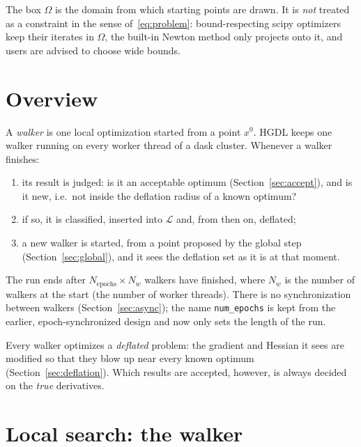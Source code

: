\documentclass[11pt]{article}
\newcommand{\code}[1]{\texttt{#1}}
\begin{document}
The box $\Omega$ is the domain from which starting points are drawn. It is \emph{not} treated as
a constraint in the sense of~\eqref{eq:problem}: bound-respecting scipy optimizers keep their
iterates in $\Omega$, the built-in Newton method only projects onto it, and users are advised
to choose wide bounds.

\section{Overview}\label{sec:overview}

A \emph{walker} is one local optimization started from a point $x^0$. HGDL keeps one walker
running on every worker thread of a dask cluster. Whenever a walker finishes:
\begin{enumerate}
  \item its result is judged: is it an acceptable optimum (Section~\ref{sec:accept}), and is it
  new, i.e.\ not inside the deflation radius of a known optimum?
  \item if so, it is classified, inserted into $\mathcal{L}$ and, from then on, deflated;
  \item a new walker is started, from a point proposed by the global step
  (Section~\ref{sec:global}), and it sees the deflation set as it is at that moment.
\end{enumerate}
The run ends after $N_{\text{epochs}} \times N_w$ walkers have finished, where $N_w$ is the
number of walkers at the start (the number of worker threads). There is no synchronization
between walkers (Section~\ref{sec:async}); the name \code{num\_epochs} is kept from the earlier,
epoch-synchronized design and now only sets the length of the run.

Every walker optimizes a \emph{deflated} problem: the gradient and Hessian it sees are
modified so that they blow up near every known optimum (Section~\ref{sec:deflation}). Which
results are accepted, however, is always decided on the \emph{true} derivatives.

\section{Local search: the walker}\label{sec:local}
\end{document}
